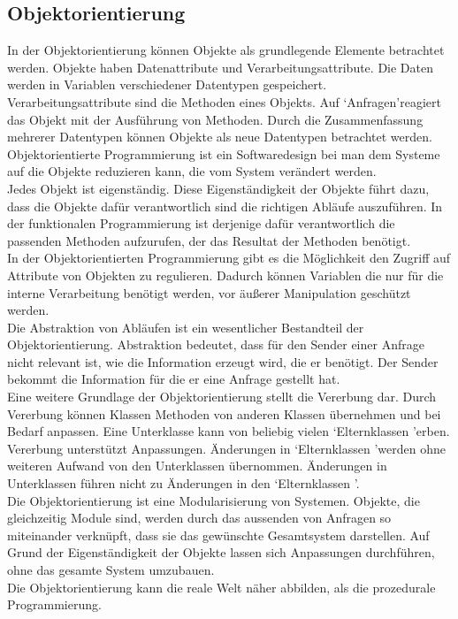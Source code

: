 \documentclass[12pt,a4paper]{article}
\begin{document}
\subsection{Objektorientierung}
\label{Objektorientierung}
In der Objektorientierung können Objekte als grundlegende Elemente betrachtet werden. Objekte haben Datenattribute und Verarbeitungsattribute. Die Daten werden in Variablen verschiedener Datentypen gespeichert. Verarbeitungsattribute sind die Methoden eines Objekts. Auf \lq Anfragen\rq\space reagiert das Objekt mit der Ausführung von Methoden. Durch die Zusammenfassung mehrerer Datentypen können Objekte als neue Datentypen betrachtet werden.\\
Objektorientierte Programmierung ist ein Softwaredesign bei man dem Systeme auf die Objekte reduzieren kann, die vom System verändert werden.\\
Jedes Objekt ist eigenständig. Diese Eigenständigkeit der Objekte führt dazu, dass die Objekte dafür verantwortlich sind die richtigen Abläufe auszuführen. In der funktionalen Programmierung ist derjenige dafür verantwortlich die passenden Methoden aufzurufen, der das Resultat der Methoden benötigt.\\
In der Objektorientierten Programmierung gibt es die Möglichkeit den Zugriff auf Attribute von Objekten zu regulieren. Dadurch können Variablen die nur für die interne Verarbeitung benötigt werden, vor äußerer Manipulation geschützt werden.\\
Die Abstraktion von Abläufen ist ein wesentlicher Bestandteil der Objektorientierung. Abstraktion bedeutet, dass für den Sender einer Anfrage nicht relevant ist, wie die Information erzeugt wird, die er benötigt. Der Sender bekommt die Information für die er eine Anfrage gestellt hat. \\
Eine weitere Grundlage der Objektorientierung stellt die Vererbung dar. Durch Vererbung können Klassen Methoden von anderen Klassen übernehmen und bei Bedarf anpassen. Eine Unterklasse kann von beliebig vielen \lq Elternklassen \rq\space erben. Vererbung unterstützt Anpassungen. Änderungen in \lq Elternklassen \rq\space werden ohne weiteren Aufwand von den Unterklassen übernommen. Änderungen in Unterklassen führen nicht zu Änderungen in den  \lq Elternklassen \rq\space.\\
Die Objektorientierung ist eine Modularisierung von Systemen. Objekte, die gleichzeitig Module sind, werden durch das aussenden von Anfragen so miteinander verknüpft, dass sie das gewünschte Gesamtsystem darstellen. Auf Grund der Eigenständigkeit der Objekte lassen sich Anpassungen durchführen, ohne das gesamte System umzubauen.\\
Die Objektorientierung kann die reale Welt näher abbilden, als die prozedurale Programmierung\cite{10.1145/71605.71612}.
\end{document}
